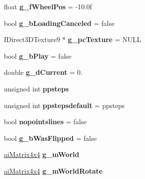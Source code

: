 \begin{DoxyCompactItemize}
\item 
\hypertarget{namespace_assimp_view_a37224c28037c011f68841d45aca360e2}{float {\bfseries g\+\_\+f\+Wheel\+Pos} = -\/10.\+0f}\label{namespace_assimp_view_a37224c28037c011f68841d45aca360e2}

\item 
\hypertarget{namespace_assimp_view_a8d7e868a0caf1b12782b0a407ab3e2da}{bool {\bfseries g\+\_\+b\+Loading\+Canceled} = false}\label{namespace_assimp_view_a8d7e868a0caf1b12782b0a407ab3e2da}

\item 
\hypertarget{namespace_assimp_view_a23f24b28d368568073d4f85ffb786a94}{I\+Direct3\+D\+Texture9 $\ast$ {\bfseries g\+\_\+pc\+Texture} = N\+U\+L\+L}\label{namespace_assimp_view_a23f24b28d368568073d4f85ffb786a94}

\item 
\hypertarget{namespace_assimp_view_a941fcc8d3b6cb8cc7eb4563364d3eb93}{bool {\bfseries g\+\_\+b\+Play} = false}\label{namespace_assimp_view_a941fcc8d3b6cb8cc7eb4563364d3eb93}

\item 
\hypertarget{namespace_assimp_view_ae37d0e5215cfbf217ae009c90719563d}{double {\bfseries g\+\_\+d\+Current} = 0.}\label{namespace_assimp_view_ae37d0e5215cfbf217ae009c90719563d}

\item 
unsigned int {\bfseries ppsteps}
\item 
\hypertarget{namespace_assimp_view_aee1d960e847b91bb9e3f935ccebe82e0}{unsigned int {\bfseries ppstepsdefault} = ppsteps}\label{namespace_assimp_view_aee1d960e847b91bb9e3f935ccebe82e0}

\item 
\hypertarget{namespace_assimp_view_adae5b619a78a4ad637067c6f24ba6a68}{bool {\bfseries nopointslines} = false}\label{namespace_assimp_view_adae5b619a78a4ad637067c6f24ba6a68}

\item 
\hypertarget{namespace_assimp_view_abf4bbd176455f7ad75fba14dbc6aa9ab}{bool {\bfseries g\+\_\+b\+Was\+Flipped} = false}\label{namespace_assimp_view_abf4bbd176455f7ad75fba14dbc6aa9ab}

\item 
\hypertarget{namespace_assimp_view_a8de3f6cf7864f91ff3809a4729222b4d}{\hyperlink{structai_matrix4x4}{ai\+Matrix4x4} {\bfseries g\+\_\+m\+World}}\label{namespace_assimp_view_a8de3f6cf7864f91ff3809a4729222b4d}

\item 
\hypertarget{namespace_assimp_view_ab8f38c1f43d181f545f12a3006dcf0df}{\hyperlink{structai_matrix4x4}{ai\+Matrix4x4} {\bfseries g\+\_\+m\+World\+Rotate}}\label{namespace_assimp_view_ab8f38c1f43d181f545f12a3006dcf0df}


\end{DoxyCompactItemize}
